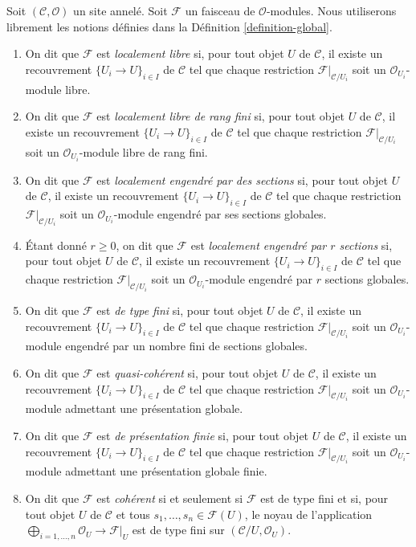 \begin{definition}
\label{definition-site-local}
Soit $(\mathcal{C}, \mathcal{O})$ un site annelé.
Soit $\mathcal{F}$ un faisceau de $\mathcal{O}$-modules.
Nous utiliserons librement les notions définies dans la
Définition \ref{definition-global}.
\begin{enumerate}
\item On dit que $\mathcal{F}$ est {\it localement libre} si, pour tout objet
$U$ de $\mathcal{C}$, il existe un recouvrement
$\{U_i \to U\}_{i \in I}$ de $\mathcal{C}$ tel que chaque restriction
$\mathcal{F}|_{\mathcal{C}/U_i}$ soit un
$\mathcal{O}_{U_i}$-module libre.
\item On dit que $\mathcal{F}$ est {\it localement libre de rang fini} si,
pour tout objet $U$ de $\mathcal{C}$, il existe un recouvrement
$\{U_i \to U\}_{i \in I}$ de $\mathcal{C}$ tel que chaque restriction
$\mathcal{F}|_{\mathcal{C}/U_i}$ soit un
$\mathcal{O}_{U_i}$-module libre de rang fini.
\item On dit que $\mathcal{F}$ est {\it localement engendré par des sections}
si, pour tout objet $U$ de $\mathcal{C}$, il existe un recouvrement
$\{U_i \to U\}_{i \in I}$ de $\mathcal{C}$ tel que chaque restriction
$\mathcal{F}|_{\mathcal{C}/U_i}$ soit un $\mathcal{O}_{U_i}$-module engendré
par ses sections globales.
\item Étant donné $r \geq 0$, on dit que $\mathcal{F}$ est
{\it localement engendré par $r$ sections} si, pour tout objet $U$ de
$\mathcal{C}$, il existe un recouvrement
$\{U_i \to U\}_{i \in I}$ de $\mathcal{C}$ tel que chaque restriction
$\mathcal{F}|_{\mathcal{C}/U_i}$ soit un $\mathcal{O}_{U_i}$-module engendré
par $r$ sections globales.
\item On dit que $\mathcal{F}$ est {\it de type fini} si, pour tout objet $U$
de $\mathcal{C}$, il existe un recouvrement
$\{U_i \to U\}_{i \in I}$ de $\mathcal{C}$ tel que chaque restriction
$\mathcal{F}|_{\mathcal{C}/U_i}$ soit un $\mathcal{O}_{U_i}$-module engendré
par un nombre fini de sections globales.
\item On dit que $\mathcal{F}$ est {\it quasi-cohérent} si, pour tout objet
$U$ de $\mathcal{C}$, il existe un recouvrement
$\{U_i \to U\}_{i \in I}$ de $\mathcal{C}$ tel que chaque restriction
$\mathcal{F}|_{\mathcal{C}/U_i}$ soit un $\mathcal{O}_{U_i}$-module admettant
une présentation globale.
\item On dit que $\mathcal{F}$ est {\it de présentation finie} si, pour tout
objet $U$ de $\mathcal{C}$, il existe un recouvrement
$\{U_i \to U\}_{i \in I}$ de $\mathcal{C}$ tel que chaque restriction
$\mathcal{F}|_{\mathcal{C}/U_i}$ soit un $\mathcal{O}_{U_i}$-module admettant
une présentation globale finie.
\item On dit que $\mathcal{F}$ est {\it cohérent} si et seulement si
$\mathcal{F}$ est de type fini et si, pour tout objet $U$ de $\mathcal{C}$
et tous $s_1, \ldots, s_n \in \mathcal{F}(U)$, le noyau de l'application
$\bigoplus_{i = 1, \ldots, n} \mathcal{O}_U \to \mathcal{F}|_U$
est de type fini sur $(\mathcal{C}/U, \mathcal{O}_U)$.
\end{enumerate}
\end{definition}


